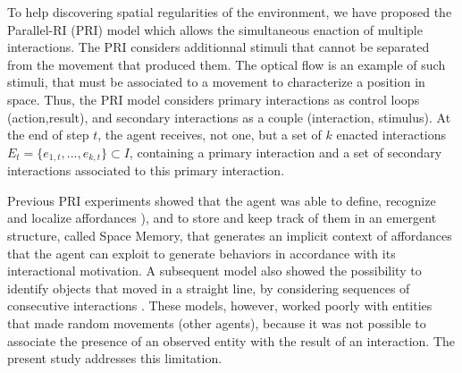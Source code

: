\documentclass[conference]{IEEEtran}
\begin{document}
To help discovering spatial regularities of the environment, we have proposed the Parallel-RI (PRI) model which allows the simultaneous enaction of multiple interactions. 
The PRI considers additionnal stimuli that cannot be separated from the movement that produced them. The optical flow is an example of such stimuli, that must be associated to a movement to characterize a position in space. Thus, the PRI model considers primary interactions as control loops (action,result), and secondary interactions as a couple (interaction, stimulus).
At the end of step $t$, %
the agent receives, not one, but a set of $k$ enacted interactions $E_t=\{e_{1,t},..., e_{k,t}\} \subset I$, containing a primary interaction and a set of secondary interactions associated to this primary interaction. %

Previous PRI experiments showed that the agent was able to define, recognize and localize affordances \cite{gibson:affordances}), %
and to store and keep track of them in an emergent structure, called Space Memory, that generates an implicit context of affordances that the agent can exploit to generate behaviors in accordance with its interactional motivation.
A subsequent model also showed the possibility to identify objects that moved in a straight line, by considering sequences of consecutive interactions \cite{gay:dynamic}. 
These models, however, worked poorly with entities that made random movements (other agents), because it was not possible to associate the presence of an observed entity with the result of an interaction. The present study addresses this limitation.

\end{document}

